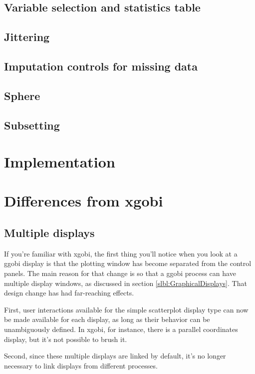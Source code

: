 \documentclass[11pt]{article}
\begin{document}
\subsection{Variable selection and statistics table}
\label{slbl:VarStats}
\subsection{Jittering}
\subsection{Imputation controls for missing data}
\subsection{Sphere}
\label{slbl:Sphere}
\subsection{Subsetting}

\section{Implementation}

\section{Differences from xgobi}
\label{slbl:xgobi}

\subsection {Multiple displays}

If you're familiar with xgobi, the first thing you'll notice
when you look at a ggobi display is that the plotting window
has become separated from the control panels.  The main reason
for that change is so that a ggobi process can have multiple
display windows, as discussed in section
\ref{slbl:GraphicalDisplays}.   That design change has had
far-reaching effects.

First, user interactions available for the simple scatterplot display
type can now be made available for each display, as long as their
behavior can be unambiguously defined.  In xgobi, for instance, there
is a parallel coordinates display, but it's not possible to brush
it.

Second, since these multiple displays are linked by default, it's no
longer necessary to link displays from different processes.
\end{document}
